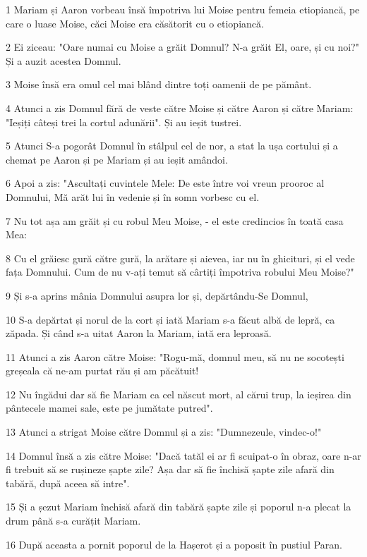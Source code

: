 \par 1 Mariam și Aaron vorbeau însă împotriva lui Moise pentru femeia etiopiancă, pe care o luase Moise, căci Moise era căsătorit cu o etiopiancă.
\par 2 Ei ziceau: "Oare numai cu Moise a grăit Domnul? N-a grăit El, oare, și cu noi?" Și a auzit acestea Domnul.
\par 3 Moise însă era omul cel mai blând dintre toți oamenii de pe pământ.
\par 4 Atunci a zis Domnul fără de veste către Moise și către Aaron și către Mariam: "Ieșiți câteși trei la cortul adunării". Și au ieșit tustrei.
\par 5 Atunci S-a pogorât Domnul în stâlpul cel de nor, a stat la ușa cortului și a chemat pe Aaron și pe Mariam și au ieșit amândoi.
\par 6 Apoi a zis: "Ascultați cuvintele Mele: De este între voi vreun prooroc al Domnului, Mă arăt lui în vedenie și în somn vorbesc cu el.
\par 7 Nu tot așa am grăit și cu robul Meu Moise, - el este credincios în toată casa Mea:
\par 8 Cu el grăiesc gură către gură, la arătare și aievea, iar nu în ghicituri, și el vede fața Domnului. Cum de nu v-ați temut să cârtiți împotriva robului Meu Moise?"
\par 9 Și s-a aprins mânia Domnului asupra lor și, depărtându-Se Domnul,
\par 10 S-a depărtat și norul de la cort și iată Mariam s-a făcut albă de lepră, ca zăpada. Și când s-a uitat Aaron la Mariam, iată era leproasă.
\par 11 Atunci a zis Aaron către Moise: "Rogu-mă, domnul meu, să nu ne socotești greșeala că ne-am purtat rău și am păcătuit!
\par 12 Nu îngădui dar să fie Mariam ca cel născut mort, al cărui trup, la ieșirea din pântecele mamei sale, este pe jumătate putred".
\par 13 Atunci a strigat Moise către Domnul și a zis: "Dumnezeule, vindec-o!"
\par 14 Domnul însă a zis către Moise: "Dacă tatăl ei ar fi scuipat-o în obraz, oare n-ar fi trebuit să se rușineze șapte zile? Așa dar să fie închisă șapte zile afară din tabără, după aceea să intre".
\par 15 Și a șezut Mariam închisă afară din tabără șapte zile și poporul n-a plecat la drum până s-a curățit Mariam.
\par 16 După aceasta a pornit poporul de la Hașerot și a poposit în pustiul Paran.

